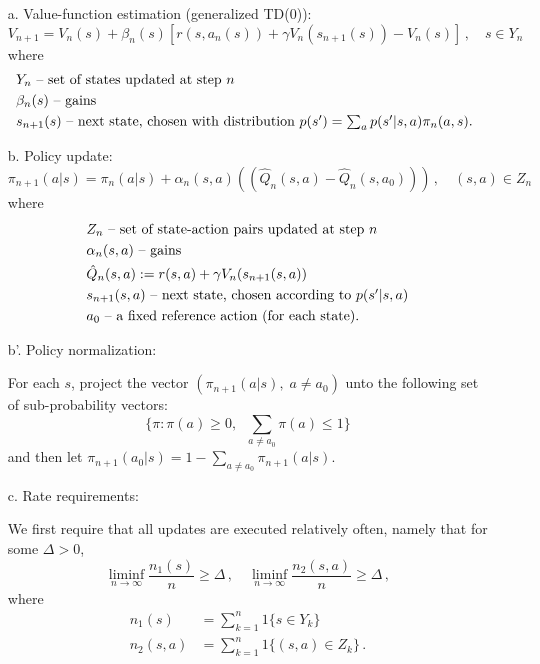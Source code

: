 \begin{itemize}
\item[a.]
Value-function estimation (generalized TD(0)):
$$
V_{n+1}=V_n(s)+\beta_n(s)[r(s,a_n(s))+\gamma V_n(s_{n+1}(s))-V_n(s)]\,,\quad s\in Y_n
$$
where
\begin{align*}
&  Y_n   \mbox{ \rm -- set of states updated at step $n$} \\
&  \beta_n(s)  \mbox{ \rm -- gains }\\
& s_{n+1}(s)  \mbox { \rm -- next state, chosen with distribution\ }
         \mbox{\rm $p(s') = \sum_a p(s'|s,a)\pi_n(a,s)$.
}
\end{align*}

\item[b.] Policy update:
$$
\pi_{n+1}(a|s)=\pi_{n}(a|s) + \alpha_n(s,a) (( \hat{Q}_n(s,a) - \hat{Q}_n(s,a_0) ))\,,
\quad (s,a) \in Z_n
$$
where
\begin{align*}
& Z_n  \mbox{ \rm -- set of state-action pairs  updated at step $n$} \\
& \alpha_n(s,a) \mbox{ \rm -- gains} \\
& \hat{Q}_n(s,a):=r(s,a)+\gamma V_n(s_{n+1}(s,a))\\
& s_{n+1}(s,a) \mbox{ \rm -- next state, chosen according to $p(s'|s,a)$} \\
& a_0 \mbox { \rm -- a fixed reference action (for each state).}
\end{align*}

\item[b'.] Policy normalization:

For each $s$, project the vector $(\pi_{n+1}(a|s),\; a\not= a_0)$ unto the
following set
of sub-probability vectors:
$$
\{\pi: \pi(a)\ge 0,\;\; \sum_{a\not = a_0}\pi(a)\le 1\}
$$
and then let $\pi_{n+1}(a_0|s)=1-\sum_{ a\not = a_0}\pi_{n+1}(a|s) $.


\item[c.] Rate requirements:

We first require that all updates are executed relatively often, namely that for
some $\Delta>0$,
$$
\liminf_{n\to\infty}\frac{n_1(s)}{n} \ge \Delta\,,\quad
\liminf_{n\to\infty}\frac{n_2(s,a)}{n} \ge \Delta\,,
$$
where
\begin{align*}
n_1(s) &= \sum_{k=1}^n 1\{s\in Y_k\} \\
n_2(s,a) &= \sum_{k=1}^n 1\{(s,a) \in Z_k\} \,.
\end{align*}


\end{itemize}
